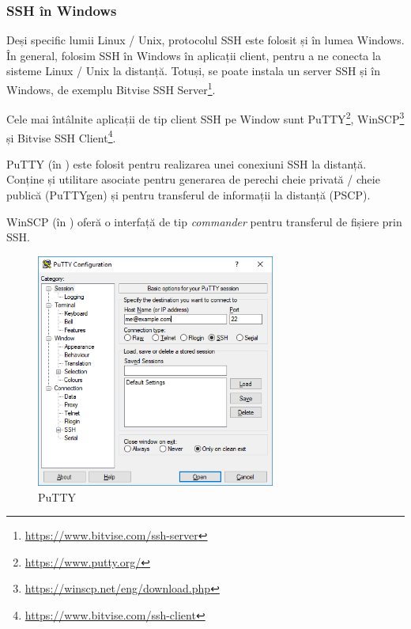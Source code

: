 \subsubsection{SSH în Windows}
\label{sec:sec:transfer:ssh:windows}

Deși specific lumii Linux / Unix, protocolul SSH este folosit și în lumea Windows.
În general, folosim SSH în Windows în aplicații client, pentru a ne conecta la sisteme Linux / Unix la distanță.
Totuși, se poate instala un server SSH și în Windows, de exemplu Bitvise SSH Server\footnote{\url{https://www.bitvise.com/ssh-server}}.

Cele mai întâlnite aplicații de tip client SSH pe Window sunt PuTTY\footnote{\url{https://www.putty.org/}}, WinSCP\footnote{\url{https://winscp.net/eng/download.php}} și Bitvise SSH Client\footnote{\url{https://www.bitvise.com/ssh-client}}.

PuTTY (în ) este folosit pentru realizarea unei conexiuni SSH la distanță.
Conține și utilitare asociate pentru generarea de perechi cheie privată / cheie publică (PuTTYgen) și pentru transferul de informații la distanță (PSCP).

WinSCP (în ) oferă o interfață de tip \textit{commander} pentru transferul de fișiere prin SSH.

\begin{figure}[!htbp]
  \centering
  \includegraphics[width=0.7\textwidth]{chapters/12-sec/img/putty.png}
  \caption{PuTTY}
  \label{fig:sec:putty}
\end{figure}


